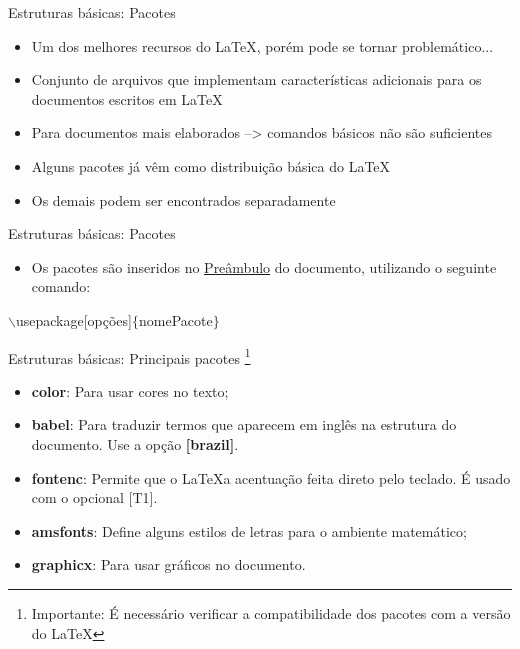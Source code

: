 \begin{frame}{Estruturas básicas: Pacotes}
    \begin{itemize}
        \item Um dos melhores recursos do \LaTeX, porém pode se tornar problemático...
        \item Conjunto de arquivos que implementam características adicionais para os documentos escritos em \LaTeX
        \item  Para documentos mais elaborados --> comandos básicos não são suficientes
        \item Alguns pacotes já vêm como distribuição básica do \LaTeX
        \item Os demais podem ser encontrados separadamente
    \end{itemize}
\end{frame}

\begin{frame}{Estruturas básicas: Pacotes}
    \begin{itemize}
        \item Os pacotes são inseridos no \underline{Preâmbulo} do documento, utilizando o seguinte comando:
    \end{itemize}
    \begin{block}{}
        $\backslash$usepackage[opções]$\{$nomePacote$\}$\\
    \end{block}
\end{frame}

\begin{frame}{Estruturas básicas: Principais pacotes \footnote{Importante: É necessário verificar a compatibilidade dos pacotes com a versão\\ do \LaTeX}}
    \begin{itemize}
        \item \textbf{color}: Para usar cores no texto;
        \item \textbf{babel}: Para traduzir termos que aparecem em inglês na estrutura do documento. Use a opção \textbf{[brazil]}.
        \item \textbf{fontenc}: Permite que o \LaTeX a acentuação feita direto pelo teclado. É usado com o opcional [T1].
        \item \textbf{amsfonts}: Define alguns estilos de letras para o ambiente matemático;
        \item \textbf{graphicx}: Para usar gráficos no documento.
        
    \end{itemize}
\end{frame}


